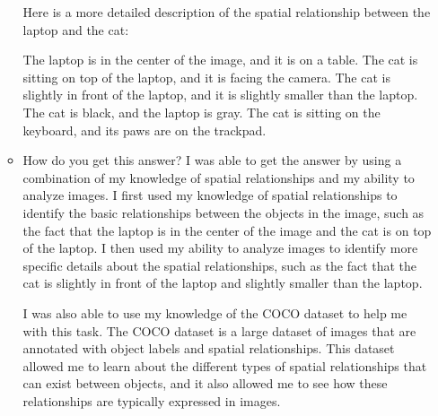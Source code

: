 \begin{enumerate}
\begin{itemize}
        Here is a more detailed description of the spatial relationship between the laptop and the cat:
        
        The laptop is in the center of the image, and it is on a table.
        The cat is sitting on top of the laptop, and it is facing the camera.
        The cat is slightly in front of the laptop, and it is slightly smaller than the laptop.
        The cat is black, and the laptop is gray.
        The cat is sitting on the keyboard, and its paws are on the trackpad.
        \item How do you get this answer?
        \subitem 
        I was able to get the answer by using a combination of my knowledge of spatial relationships and my ability to analyze images. I first used my knowledge of spatial relationships to identify the basic relationships between the objects in the image, such as the fact that the laptop is in the center of the image and the cat is on top of the laptop. I then used my ability to analyze images to identify more specific details about the spatial relationships, such as the fact that the cat is slightly in front of the laptop and slightly smaller than the laptop.
        
        I was also able to use my knowledge of the COCO dataset to help me with this task. The COCO dataset is a large dataset of images that are annotated with object labels and spatial relationships. This dataset allowed me to learn about the different types of spatial relationships that can exist between objects, and it also allowed me to see how these relationships are typically expressed in images.
        

\end{itemize}
\end{enumerate}
